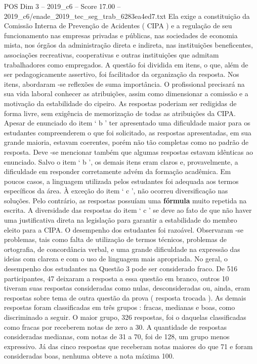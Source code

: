 \begin{textsample}{POS Dim 3 – 2019\_c6 – Score 17.00 – 2019\_c6/enade\_2019\_tec\_seg\_trab\_6283ea4ed7.txt}
Ela exige a constituição da Comissão Interna de Prevenção de Acidentes ( CIPA ) e a regulação de seu funcionamento nas empresas privadas e públicas, nas sociedades de economia mista, nos órgãos da administração direta e indireta, nas instituições beneficentes, associações recreativas, cooperativas e outras instituições que admitam trabalhadores como empregados.
A questão foi dividida em itens, o que, além de ser pedagogicamente assertivo, foi facilitador da organização da resposta.
Nos itens, abordaram -se reflexões de suma importância.
O profissional precisará na sua vida laboral conhecer as atribuições, assim como dimensionar a comissão e a motivação da estabilidade do cipeiro.
As respostas poderiam ser redigidas de forma livre, sem exigência de memorização de todas as atribuições da CIPA.
Apesar de enunciado do item ‘ b ’ ter apresentado uma dificuldade maior para os estudantes compreenderem o que foi solicitado, as respostas apresentadas, em sua grande maioria, estavam coerentes, porém não tão completas como no padrão de resposta.
Deve -se mencionar também que algumas respostas estavam idênticas ao enunciado.
Salvo o item ‘ b ’, os demais itens eram claros e, provavelmente, a dificuldade em responder corretamente advém da formação acadêmica.
Em poucos casos, a linguagem utilizada pelos estudantes foi adequada aos termos específicos da área.
À exceção do item ‘ c ’, não ocorreu diversificação nas soluções.
Pelo contrário, as respostas possuíam uma \textbf{fórmula} muito repetida na escrita.
A diversidade das respostas do item ‘ c ’ se deve ao fato de que não haver uma justificativa direta na legislação para garantir a estabilidade do membro eleito para a CIPA.
O desempenho dos estudantes foi razoável.
Observaram -se problemas, tais como falta de utilização de termos técnicos, problemas de ortografia, de concordância verbal, e uma grande dificuldade na expressão das ideias com clareza e com o uso de linguagem mais apropriada.
No geral, o desempenho dos estudantes na Questão 3 pode ser considerado fraco.
De 516 participantes, 47 deixaram a resposta a essa questão em branco, outros 10 tiveram suas respostas consideradas como nulas, desconsideradas ou, ainda, eram respostas sobre tema de outra questão da prova ( resposta trocada ).
As demais respostas foram classificadas em três grupos : fracas, medianas e boas, como discriminado a seguir.
O maior grupo, 326 respostas, foi o daquelas classificadas como fracas por receberem notas de zero a 30.
A quantidade de respostas consideradas medianas, com notas de 31 a 70, foi de 128, um grupo menos expressivo.
Já das cinco respostas que receberam notas maiores do que 71 e foram consideradas boas, nenhuma obteve a nota máxima 100.

\end{textsample}

